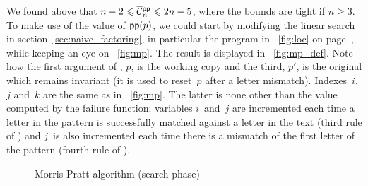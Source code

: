 \vspace*{-20pt}


We found above that \(n-2 \leqslant \OC{\fun{pp}}{n} \leqslant 2n -
5\), where the bounds are tight if \(n \geqslant 3\). To make use of
the value of \(\textsf{pp}(p)\), we could start by modifying the linear
search in section~\ref{sec:naive_factoring}, in particular the program
in \fig~\ref{fig:loc} on page~\pageref{fig:loc}, while keeping an eye
on \fig~\vref{fig:mp}. The result is displayed in
\fig~\vref{fig:mp_def}. Note how the first argument of
, \(p\), is the working copy and the
third, \(p'\), is the original which remains invariant (it is used to
reset~\(p\) after a letter mismatch). Indexes~\(i\), \(j\) and~\(k\)
are the same as in \fig~\vref{fig:mp}. The latter is none other than
the value computed by the failure function; variables \(i\)~and~\(j\)
are incremented each time a letter in the pattern is successfully
matched against a letter in the text (third rule of ) and
\(j\)~is also incremented each time there is a mismatch of the first
letter of the pattern (fourth rule of ).
\begin{figure}[h]
\centering
\abovedisplayskip=0pt
\belowdisplayskip=0pt
\caption{Morris-Pratt algorithm (search phase)}
\label{fig:mp_def}
\end{figure}


